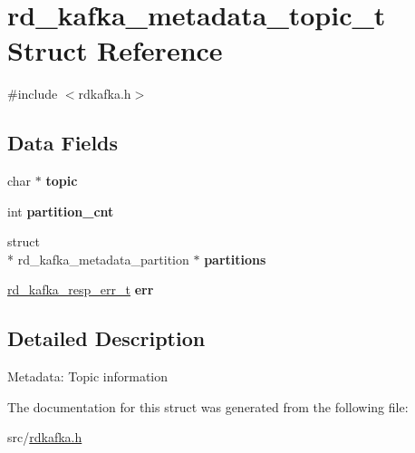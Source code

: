 \hypertarget{structrd__kafka__metadata__topic__t}{\section{rd\-\_\-kafka\-\_\-metadata\-\_\-topic\-\_\-t Struct Reference}
\label{structrd__kafka__metadata__topic__t}
}


{\ttfamily \#include $<$rdkafka.\-h$>$}

\subsection*{Data Fields}
\begin{DoxyCompactItemize}
\item 
\hypertarget{structrd__kafka__metadata__topic__t_a4155a2c939e93b0292398d2590201718}{char $\ast$ {\bfseries topic}}\label{structrd__kafka__metadata__topic__t_a4155a2c939e93b0292398d2590201718}

\item 
\hypertarget{structrd__kafka__metadata__topic__t_aaee48d1e35102c49858e46a3a5f6d043}{int {\bfseries partition\-\_\-cnt}}\label{structrd__kafka__metadata__topic__t_aaee48d1e35102c49858e46a3a5f6d043}

\item 
\hypertarget{structrd__kafka__metadata__topic__t_a62c2ba710cde485ba7157e69bc902a17}{struct \\*
rd\-\_\-kafka\-\_\-metadata\-\_\-partition $\ast$ {\bfseries partitions}}\label{structrd__kafka__metadata__topic__t_a62c2ba710cde485ba7157e69bc902a17}

\item 
\hypertarget{structrd__kafka__metadata__topic__t_aa178078dba633d6bb1b0e2844addda2a}{\hyperlink{rdkafka_8h_a03509bab51072c72a8dcf52337e6d5cb}{rd\-\_\-kafka\-\_\-resp\-\_\-err\-\_\-t} {\bfseries err}}\label{structrd__kafka__metadata__topic__t_aa178078dba633d6bb1b0e2844addda2a}

\end{DoxyCompactItemize}


\subsection{Detailed Description}
Metadata\-: Topic information 

The documentation for this struct was generated from the following file\-:\begin{DoxyCompactItemize}
\item 
src/\hyperlink{rdkafka_8h}{rdkafka.\-h}\end{DoxyCompactItemize}

